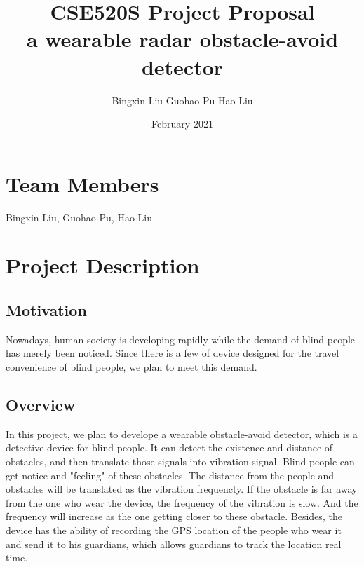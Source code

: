 \documentclass{article}
\title{\textbf{CSE520S Project Proposal}\\a wearable radar obstacle-avoid detector}
\author{Bingxin Liu Guohao Pu Hao Liu}
\date{February 2021}
\begin{document}
    \begin{titlepage}
        \maketitle
    \end{titlepage}


    \section{Team Members}
        \begin{flushleft}
            Bingxin Liu, Guohao Pu, Hao Liu\\
        \end{flushleft}
    \section{Project Description}
        \subsection{Motivation}
        Nowadays, human society is developing rapidly while the demand of blind people has merely been noticed. 
        Since there is a few of device designed for the travel convenience of blind people, we plan to meet this demand.  
        
        \subsection{Overview}
        In this project, we plan to develope a wearable obstacle-avoid detector, which is a detective device for blind people. It can detect the existence and distance of obstacles, and then translate those signals into vibration signal.  Blind people can get notice and "feeling" of these obstacles. The distance from the people and obstacles will be translated as the vibration frequencty. If the obstacle is far away from the one who wear the device, the frequency of the vibration is slow. And the frequency will increase  as the one getting closer to these obstacle. Besides, the device has the ability of recording the GPS location of the people who wear it and send it to his guardians, which allows guardians to track the location real time.
\end{document}
